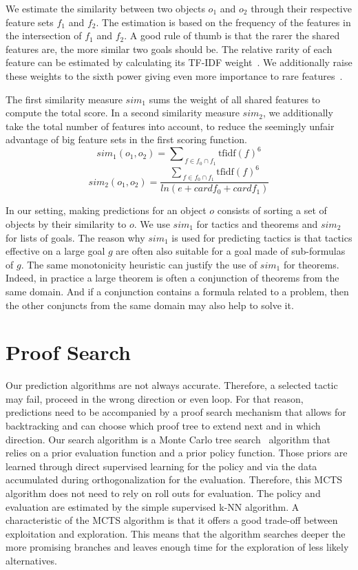\documentclass[runningheads,a4paper,draft]{svjour3}
\begin{document}
We estimate the similarity between two objects $o_1$ and $o_2$
through their respective feature sets $f_1$ and $f_2$.
The estimation is based on the frequency of the features in the intersection of
$f_1$ and $f_2$. A good rule of thumb is that the rarer the shared features
are, the more similar two goals should be. The relative rarity of each feature
can be estimated by calculating its TF-IDF weight~\cite{Jones72astatistical}.
We additionally raise these weights to the sixth power giving
even more importance
to rare features~\cite{BlanchetteGKKU16}.

The first similarity measure $sim_1$ sums the weight of all shared
features to compute the total score.
In a second similarity measure $sim_2$, we additionally take
the total number of features into account, to reduce the seemingly unfair
advantage of big
feature sets in the first scoring function.
\[sim_1 (o_1, o_2) = {\sum\nolimits_{\,f \in f_0 \cap 
f_1}{\text{tfidf}(f)^{6}}}\]
\[sim_2 (o_1, o_2) = \frac{{\sum\nolimits_{\,f \in f_0 \cap
f_1}{\text{tfidf}(f)^{6}}}}
{ln (e + \mathit{card} f_0 + \mathit{card} f_1)}\]

In our setting, making predictions for an object $o$ consists of sorting a set
of objects by their similarity to $o$. We use $sim_1$ for tactics and theorems
and $sim_2$ for lists of goals. The reason why $sim_1$ is used for
predicting tactics is that tactics effective on a large goal $g$ are often also
suitable for a goal made of sub-formulas of $g$. The same monotonicity
heuristic can justify the use of $sim_1$ for theorems. Indeed, in practice a
large theorem is often a conjunction of theorems from the same domain.
And if a conjunction contains a formula related to a problem, then the other
conjuncts from the same domain may also help to solve it.


\section{Proof Search}\label{sec:proofsearch}

Our prediction algorithms are not always accurate. 
Therefore, a selected tactic may
fail, proceed in the wrong direction or even loop. 
For that reason, predictions need to be accompanied by a
proof search mechanism that allows for backtracking and
can choose which proof tree to extend next and in which direction.
Our search algorithm is a Monte Carlo tree search~\cite{montecarlo} algorithm
that relies
on a prior evaluation function and a prior policy function. Those priors are
learned through direct supervised learning for the policy and via the data
accumulated during orthogonalization for the evaluation. Therefore, this MCTS
algorithm does not need to rely on roll outs for evaluation. The
policy and evaluation are estimated by the simple supervised k-NN algorithm.
A characteristic of the MCTS algorithm is that it offers a good trade-off
between exploitation and exploration. This means that the algorithm searches
deeper the more promising branches and leaves enough time for the exploration
of less likely alternatives.
\end{document}
